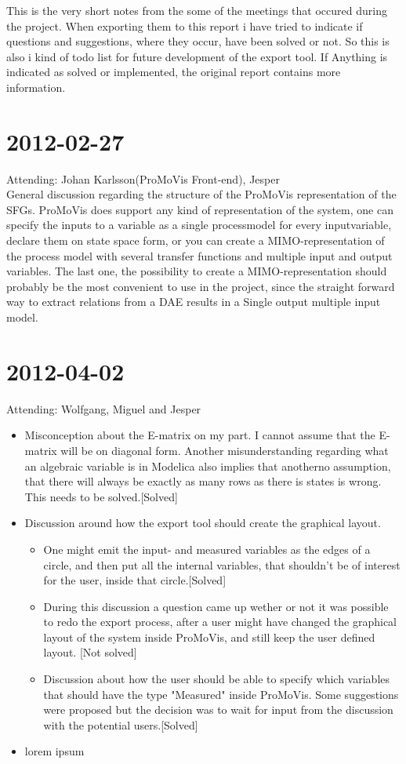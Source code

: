 This is the very short notes from the some of the meetings that occured during the project. When exporting them to this report i have tried to indicate if questions and suggestions, where they occur, have been solved or not. So this is also i kind of todo list for future development of the export tool. If Anything is indicated as solved or implemented, the original report contains more information.

\section{2012-02-27}
Attending: Johan Karlsson(ProMoVis Front-end), Jesper\\\newline General discussion regarding the structure of the ProMoVis representation of the SFGs. ProMoVis does support any kind of representation of the system, one can specify the inputs to a variable as a single processmodel for every inputvariable, declare them on state space form, or you can create a MIMO-representation of the process model with several transfer functions and multiple input and output variables. The last one, the possibility to create a MIMO-representation should probably be the most convenient to use in the project, since the straight forward way to extract relations from a DAE results in a Single output multiple input model.
\section{2012-04-02}
Attending: Wolfgang, Miguel and Jesper\\\newline 
\begin{itemize}
\item Misconception about the E-matrix on my part. I cannot assume that the E-matrix will be on diagonal form. Another misunderstanding regarding what an algebraic variable is in Modelica also implies that anotherno assumption, that there will always be exactly as many rows as there is states is wrong. This needs to be solved.[Solved]
\item Discussion around how the export tool should create the graphical layout. 
\begin{itemize}
\item One might emit the input- and measured variables as the edges of a circle, and then put all the internal variables, that shouldn't be of interest for the user, inside that circle.[Solved]
\item During this discussion a question came up wether or not it was possible to redo the export process, after a user might have changed the graphical layout of the system inside ProMoVis, and still keep the user defined layout. [Not solved]
\item Discussion about how the user should be able to specify which variables that should have the type "Measured" inside ProMoVis. Some suggestions were proposed but the decision was to wait for input from the discussion with the potential users.[Solved]
\end{itemize}
\item lorem ipsum
\end{itemize}

